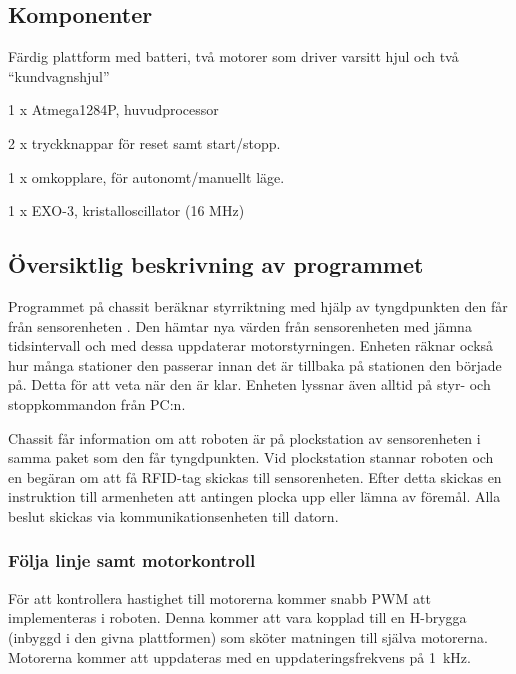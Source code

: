 \subsection{Komponenter}

\begin{packed_itemize}
\item Färdig plattform med batteri, två motorer som driver varsitt hjul och två “kundvagnshjul”
\item 1 x Atmega1284P, huvudprocessor
\item 2 x tryckknappar för reset samt start/stopp.
\item 1 x omkopplare, för autonomt/manuellt läge.
\item 1 x EXO-3, kristalloscillator (16 MHz)
\end{packed_itemize}

\subsection{Översiktlig beskrivning av programmet}

Programmet på chassit  beräknar styrriktning med hjälp av tyngdpunkten den får från sensorenheten . Den hämtar nya värden från sensorenheten med jämna tidsintervall och med dessa uppdaterar motorstyrningen. Enheten räknar också hur många stationer den passerar innan det är tillbaka på stationen den började på. Detta för att veta när den är klar. Enheten lyssnar även alltid på styr- och stoppkommandon från PC:n.

Chassit får information om att roboten är på plockstation av sensorenheten i samma paket som den får tyngdpunkten. Vid plockstation stannar roboten och en begäran om att få RFID-tag skickas till sensorenheten. Efter detta skickas en instruktion till armenheten att antingen plocka upp eller lämna av föremål. Alla beslut skickas via kommunikationsenheten till datorn.



\subsubsection{Följa linje samt motorkontroll}
\label{följalinje}

För att kontrollera hastighet till motorerna kommer snabb PWM att implementeras i roboten. Denna kommer att vara kopplad till en H-brygga (inbyggd i den givna plattformen)  som sköter matningen till själva motorerna. Motorerna kommer att uppdateras med en uppdateringsfrekvens på 1~kHz.

